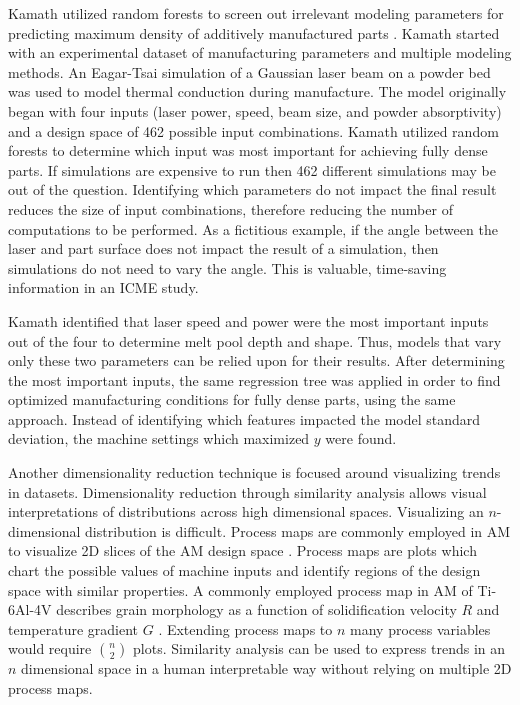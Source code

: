 Kamath utilized random forests to screen out irrelevant modeling parameters for predicting maximum density of additively manufactured parts \cite{Kamath2016}. Kamath started with an experimental dataset of manufacturing parameters and multiple modeling methods. An Eagar-Tsai simulation of a Gaussian laser beam on a powder bed was used to model thermal conduction during manufacture. The model originally began with four inputs (laser power, speed, beam size, and powder absorptivity) and a design space of 462 possible input combinations. Kamath utilized random forests to determine which input was most important for achieving fully dense parts. If simulations are expensive to run then 462 different simulations may be out of the question. Identifying which parameters do not impact the final result reduces the size of input combinations, therefore reducing the number of computations to be performed. As a fictitious example, if the angle between the laser and part surface does not impact the result of a simulation, then simulations do not need to vary the angle. This is valuable, time-saving information in an ICME study.

Kamath identified that laser speed and power were the most important inputs out of the four to determine melt pool depth and shape. Thus, models that vary only these two parameters can be relied upon for their results.  After determining the most important inputs, the same regression tree was applied in order to find optimized manufacturing conditions for fully dense parts, using the same approach. Instead of identifying which features impacted the model standard deviation, the machine settings which maximized $y$ were found. 

Another dimensionality reduction technique is focused around visualizing trends in datasets. Dimensionality reduction through similarity analysis allows visual interpretations of distributions across high dimensional spaces. Visualizing an $n$-dimensional distribution is difficult. Process maps are commonly employed in AM to visualize 2D slices of the AM design space \cite{Beuth2001}. Process maps are plots which chart the possible values of machine inputs and identify regions of the design space with similar properties. A commonly employed process map in AM of Ti-6Al-4V describes grain morphology as a function of solidification velocity $R$ and temperature gradient $G$ \cite{DeHoff2015}. Extending process maps to $n$ many process variables would require ${n \choose 2}$ plots. Similarity analysis can be used to express trends in an $n$ dimensional space in a human interpretable way without relying on multiple 2D process maps. 

